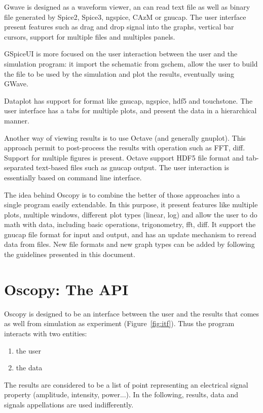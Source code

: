 \documentclass[a4paper,11pt]{article}
\begin{document}
Gwave is designed as a waveform viewer, an can read text file as well as binary file generated by Spice2, Spice3, ngspice, CAzM or gnucap.
The user interface present features such as drag and drop signal into the graphs, vertical bar cursors, support for multiple files and multiples panels.

GSpiceUI is more focused on the user interaction between the user and the simulation program: it import the schematic from gschem, allow the user to build the file to be used by the simulation and plot the results, eventually using GWave.

Dataplot has support for format like gnucap, ngspice, hdf5 and touchstone.
The user interface has a tabs for multiple plots, and present the data in a hierarchical manner.

Another way of viewing results is to use Octave (and generally gnuplot).
This approach permit to post-process the results with operation such as FFT, diff.
Support for multiple figures is present.
Octave support HDF5 file format and tab-separated text-based files such as gnucap output.
The user interaction is essentially based on command line interface.

The idea behind Oscopy is to combine the better of those approaches into a single program easily extendable.
In this purpose, it present features like multiple plots, multiple windows, different plot types (linear, log) and allow the user to do math with data, including basic operations, trigonometry, fft, diff.
It support the gnucap file format for input and output, and has an update mechanism to reread data from files.
New file formats and new graph types can be added by following the guidelines presented in this document.

\section{Oscopy: The API}
\label{sec:itf}
Oscopy is designed to be an interface between the user and the results that comes as well from simulation as experiment (Figure~\ref{fig:itf}).
Thus the program interacts with two entities:
\begin{enumerate}
\item the user
\item the data
\end{enumerate}
The results are considered to be a list of point representing an electrical signal property (amplitude, intensity, power...).
In the following, results, data and signals appellations are used indifferently.
\end{document}
